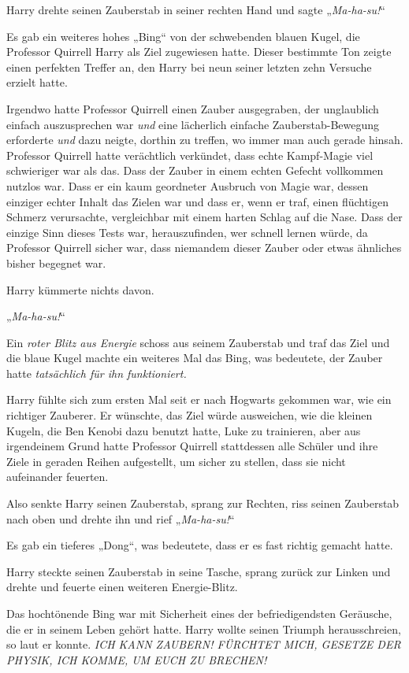 {Harry drehte seinen Zauberstab in seiner rechten Hand und sagte „\emph{Ma-ha-su!}“

Es gab ein weiteres hohes „Bing“ von der schwebenden blauen Kugel, die Professor Quirrell Harry als Ziel zugewiesen hatte. Dieser bestimmte Ton zeigte einen perfekten Treffer an, den Harry bei neun seiner letzten zehn Versuche erzielt hatte.

Irgendwo hatte Professor Quirrell einen Zauber ausgegraben, der unglaublich einfach auszusprechen war \emph{und} eine lächerlich einfache Zauberstab-Bewegung erforderte \emph{und} dazu neigte, dorthin zu treffen, wo immer man auch gerade hinsah. Professor Quirrell hatte verächtlich verkündet, dass echte Kampf-Magie viel schwieriger war als das. Dass der Zauber in einem echten Gefecht vollkommen nutzlos war. Dass er ein kaum geordneter Ausbruch von Magie war, dessen einziger echter Inhalt das Zielen war und dass er, wenn er traf, einen flüchtigen Schmerz verursachte, vergleichbar mit einem harten Schlag auf die Nase. Dass der einzige Sinn dieses Tests war, herauszufinden, wer schnell lernen würde, da Professor Quirrell sicher war, dass niemandem dieser Zauber oder etwas ähnliches bisher begegnet war.

Harry kümmerte nichts davon.

„\emph{Ma-ha-su!}“

Ein \emph{roter Blitz aus Energie} schoss aus seinem Zauberstab und traf das Ziel und die blaue Kugel machte ein weiteres Mal das Bing, was bedeutete, der Zauber hatte \emph{tatsächlich für ihn funktioniert.}

Harry fühlte sich zum ersten Mal seit er nach Hogwarts gekommen war, wie ein richtiger Zauberer. Er wünschte, das Ziel würde ausweichen, wie die kleinen Kugeln, die Ben Kenobi dazu benutzt hatte, Luke zu trainieren, aber aus irgendeinem Grund hatte Professor Quirrell stattdessen alle Schüler und ihre Ziele in geraden Reihen aufgestellt, um sicher zu stellen, dass sie nicht aufeinander feuerten.

Also senkte Harry seinen Zauberstab, sprang zur Rechten, riss seinen Zauberstab nach oben und drehte ihn und rief „\emph{Ma-ha-su!}“

Es gab ein tieferes „Dong“, was bedeutete, dass er es fast richtig gemacht hatte.

Harry steckte seinen Zauberstab in seine Tasche, sprang zurück zur Linken und drehte und feuerte einen weiteren Energie-Blitz.

Das hochtönende Bing war mit Sicherheit eines der befriedigendsten Geräusche, die er in seinem Leben gehört hatte. Harry wollte seinen Triumph herausschreien, so laut er konnte. \emph{ICH KANN ZAUBERN! FÜRCHTET MICH, GESETZE DER PHYSIK, ICH KOMME, UM EUCH ZU BRECHEN!}

}
